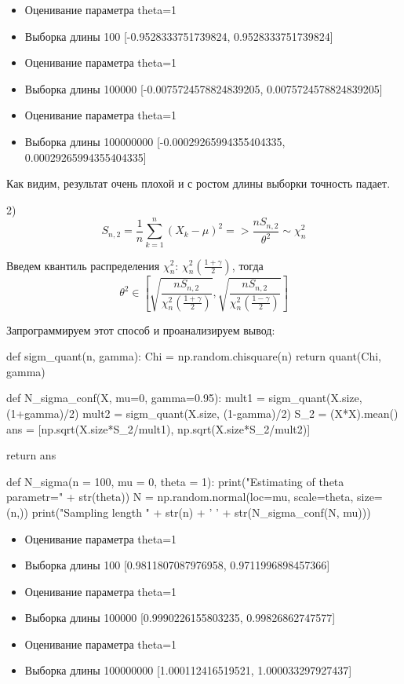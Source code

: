 \documentclass{article}
\begin{document}
\begin{itemize}
	\item Оценивание параметра theta=1
	\item Выборка длины 100 [-0.9528333751739824, 0.9528333751739824]
	\item Оценивание параметра theta=1
	\item Выборка длины 100000 [-0.0075724578824839205, 0.0075724578824839205]
	\item Оценивание параметра theta=1
	\item Выборка длины 100000000 [-0.00029265994355404335, 0.00029265994355404335]
\end{itemize}

Как видим, результат очень плохой и с ростом длины выборки точность падает.

2)
\[S_{n, 2} = \frac{1}{n}\sum_{k=1}^{n}\left(X_k-\mu\right)^2 = > \frac{nS_{n,2}}{\theta^2} \sim \chi_n^2\]

Введем квантиль распределения $\chi_n^2$: $\chi_n^2(\frac{1+\gamma}{2})$, тогда 
\[\theta^2 \in \left[\sqrt{\frac{nS_{n, 2}}{\chi_n^2\left(\frac{1+\gamma}{2}\right)}}, \sqrt{\frac{nS_{n, 2}}{\chi_n^2\left(\frac{1-\gamma}{2}\right)}}\right]\]

Запрограммируем этот способ и проанализируем вывод:
\begin{python}
def sigm_quant(n, gamma):
	Chi = np.random.chisquare(n)
	return quant(Chi, gamma)

def N_sigma_conf(X, mu=0, gamma=0.95):
	mult1 = sigm_quant(X.size, (1+gamma)/2)
	mult2 = sigm_quant(X.size, (1-gamma)/2)
	S_2 = (X*X).mean()
	ans = [np.sqrt(X.size*S_2/mult1), np.sqrt(X.size*S_2/mult2)]

	return ans
	
def N_sigma(n = 100, mu = 0, theta = 1):
	print("Estimating of theta parametr=" + str(theta))
	N = np.random.normal(loc=mu, scale=theta, size=(n,))
	print("Sampling length " + str(n) + ' ' + 
		str(N_sigma_conf(N, mu)))
\end{python}

\begin{itemize}
	\item Оценивание параметра theta=1
	\item Выборка длины 100 [0.9811807087976958, 0.9711996898457366]
	\item Оценивание параметра theta=1
	\item Выборка длины 100000 [0.9990226155803235, 0.99826862747577]
	\item Оценивание параметра theta=1
	\item Выборка длины 100000000 [1.000112416519521, 1.000033297927437]
\end{itemize}
\end{document}
